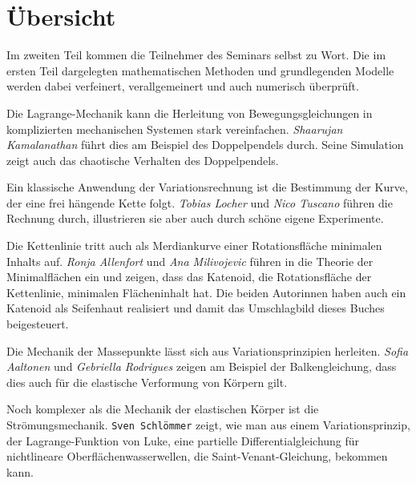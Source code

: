 %
%
%
\chapter*{Übersicht}
\fancyhead[RE]{}
\label{buch:uebersicht}
Im zweiten Teil kommen die Teilnehmer des Seminars selbst zu Wort.
Die im ersten Teil dargelegten mathematischen Methoden und
grundlegenden Modelle werden dabei verfeinert, verallgemeinert
und auch numerisch überprüft.

Die Lagrange-Mechanik kann die Herleitung von Bewegungsgleichungen
in komplizierten mechanischen Systemen stark vereinfachen.
\textit{Shaarujan Kamalanathan} führt dies am Beispiel des
Doppelpendels durch.
Seine Simulation zeigt auch das chaotische Verhalten des Doppelpendels.

Ein klassische Anwendung der Variationsrechnung ist die Bestimmung
der Kurve, der eine frei hängende Kette folgt.
\textit{Tobias Locher} und \textit{Nico Tuscano}
führen die Rechnung durch, illustrieren sie aber auch durch schöne
eigene Experimente.

Die Kettenlinie tritt auch als Merdiankurve einer Rotationsfläche
minimalen Inhalts auf.
\textit{Ronja Allenfort} und \textit{Ana Milivojevic} führen in die
Theorie der Minimalflächen ein und zeigen, dass das Katenoid,
die Rotationsfläche der Kettenlinie, minimalen Flächeninhalt hat.
Die beiden Autorinnen haben auch ein Katenoid als Seifenhaut
realisiert und damit das Umschlagbild dieses Buches beigesteuert.

Die Mechanik der Massepunkte lässt sich aus Variationsprinzipien
herleiten.
\textit{Sofia Aaltonen} und \textit{Gebriella Rodrigues} zeigen
am Beispiel der Balkengleichung, dass dies auch für die elastische 
Verformung von Körpern gilt.

Noch komplexer als die Mechanik der elastischen Körper ist die
Strömungsmechanik.
\texttt{Sven Schlömmer} zeigt, wie man aus einem Variationsprinzip,
der Lagrange-Funktion von Luke, eine partielle Differentialgleichung
für nichtlineare Oberflächenwasserwellen, die Saint-Venant-Gleichung,
bekommen kann.

